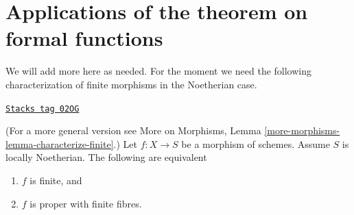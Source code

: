 \section{Applications of the theorem on formal functions}
\label{coherent-section-applications-formal-functions}
We will add more here as needed. For the moment we need the
following characterization of finite morphisms in the Noetherian case.

\begin{lemma}
\label{coherent-lemma-characterize-finite}
\href{https://stacks.math.columbia.edu/tag/02OG}{\texttt{Stacks tag 02OG}}

(For a more general version see
More on Morphisms, Lemma \ref{more-morphisms-lemma-characterize-finite}.)
Let $f : X \to S$ be a morphism of schemes.
Assume $S$ is locally Noetherian.
The following are equivalent
\begin{enumerate}
\item $f$ is finite, and
\item $f$ is proper with finite fibres.
\end{enumerate}
\end{lemma}

